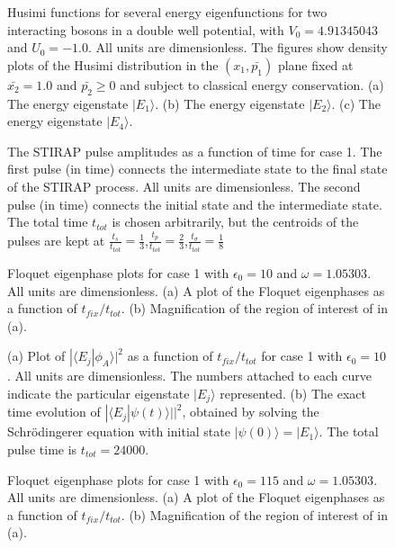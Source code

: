 \documentclass{article}
\begin{document}
\begin{figure} 
\caption{Husimi functions  for several energy eigenfunctions for two interacting bosons in a double well potential, with $V_0=4.91345043$ and $U_0=-1.0$. All units are dimensionless. The figures show density plots of the Husimi distribution in the $({x_1} , \bar{p_1})$ plane fixed at $\bar{x_2}=1.0$ and $\bar{p_2}\geq 0$ and subject to classical energy conservation. (a) The energy eigenstate $|E_1{\rangle}$.  (b) The energy eigenstate $|E_2{\rangle}$. (c) The energy eigenstate $|E_4{\rangle}$.}
\label{fig:husimis}
\end{figure}

\begin{figure}
\caption{The STIRAP pulse amplitudes as a function of time for case 1. The first pulse (in time)  connects the intermediate state to the final state of the STIRAP process. All units are dimensionless. The second pulse (in time)   connects the initial state and the intermediate state. The total time $t_{tot}$ is chosen arbitrarily, but the centroids of the pulses are kept at $\frac{t_s}{t_{tot}}=\frac{1}{3}$,$\frac{t_p}{t_{tot}}=\frac{2}{3}$,$\frac{t_{\sigma}}{t_{tot}}=\frac{1}{8}$}
\label{fig:stirap}
\end{figure}

\begin{figure}
\caption{Floquet eigenphase plots for case 1 with $\epsilon_0=10$ and  $\omega=1.05303$. All units are dimensionless.  (a) A  plot of the Floquet eigenphases as a function of $t_{fix}/t_{tot}$. (b) Magnification of the region of interest of in (a).}
\label{fig:e_10phase}
\end{figure}

\begin{figure}
\caption{(a) Plot of $|{\langle}E_j|{\phi}_A{\rangle}|^2$ as a function of $t_{fix}/t_{tot}$ for case 1 with ${\epsilon}_0=10$. All units are dimensionless. The numbers attached to each curve indicate the particular eigenstate $|E_j{\rangle}$ represented. (b) The exact time evolution of $|{\langle}E_j|{\psi}(t){\rangle|}|^2$, obtained by solving the Schr\"odingerer equation with initial state $|\psi(0){\rangle}=|E_1{\rangle}$. The total pulse time is $t_{tot}=24000$.}
\label{fig:e_10states}
\end{figure}

\begin{figure} 
\caption{Floquet eigenphase plots for case 1 with $\epsilon_0=115$ and  $\omega=1.05303$. All units are dimensionless.  (a) A  plot of the Floquet eigenphases as a function of $t_{fix}/t_{tot}$. (b) Magnification of the region of interest of in (a).}
\label{fig:e_115phase}
\end{figure}
\end{document}
